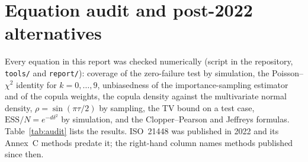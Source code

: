 \documentclass[11pt,a4paper]{article}
\begin{document}
\section{Equation audit and post-2022 alternatives}\label{sec:audit}
Every equation in this report was checked numerically (script in the repository, \texttt{tools/} and \texttt{report/}): coverage of the zero-failure test by simulation, the Poisson--$\chi^2$ identity for $k=0,\dots,9$, unbiasedness of the importance-sampling estimator and of the copula weights, the copula density against the multivariate normal density, $\rho=\sin(\pi\tau/2)$ by sampling, the TV bound on a test case, $\mathrm{ESS}/N=e^{-d\delta^2}$ by simulation, and the Clopper--Pearson and Jeffreys formulas. Table~\ref{tab:audit} lists the results. ISO~21448 was published in 2022 and its Annex~C methods predate it; the right-hand column names methods published since then.
\end{document}
